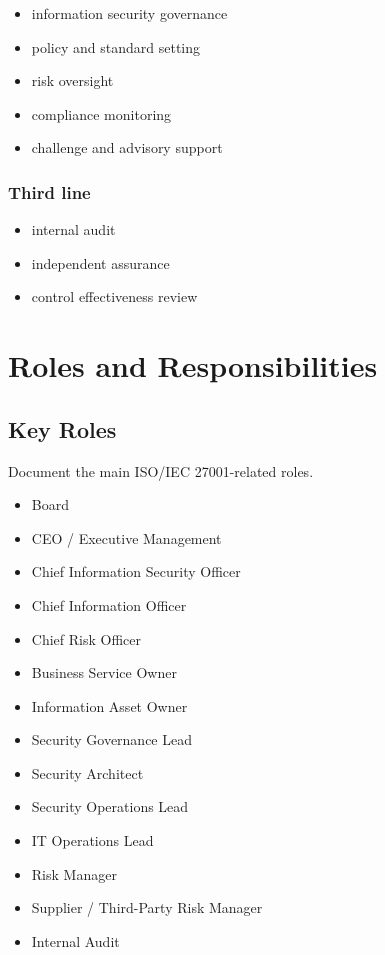 \documentclass[
  letterpaper,
  DIV=11,
  numbers=noendperiod]{scrartcl}
\providecommand{\tightlist}{%
  \setlength{\itemsep}{0pt}\setlength{\parskip}{0pt}}
\begin{document}
\begin{itemize}
\tightlist
\item
  information security governance
\item
  policy and standard setting
\item
  risk oversight
\item
  compliance monitoring
\item
  challenge and advisory support
\end{itemize}

\subsubsection{Third line}\label{third-line}

\begin{itemize}
\tightlist
\item
  internal audit
\item
  independent assurance
\item
  control effectiveness review
\end{itemize}

\section{Roles and Responsibilities}\label{roles-and-responsibilities}

\subsection{Key Roles}\label{key-roles}

Document the main ISO/IEC 27001-related roles.

\begin{itemize}
\tightlist
\item
  Board
\item
  CEO / Executive Management
\item
  Chief Information Security Officer
\item
  Chief Information Officer
\item
  Chief Risk Officer
\item
  Business Service Owner
\item
  Information Asset Owner
\item
  Security Governance Lead
\item
  Security Architect
\item
  Security Operations Lead
\item
  IT Operations Lead
\item
  Risk Manager
\item
  Supplier / Third-Party Risk Manager
\item
  Internal Audit
\end{itemize}
\end{document}
